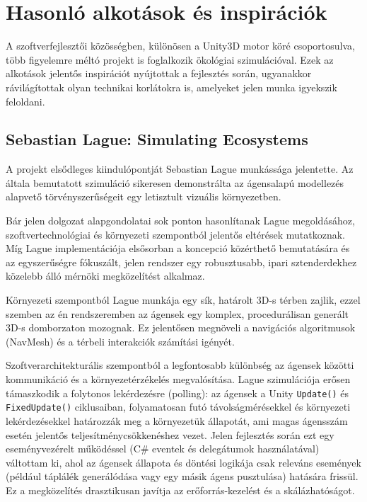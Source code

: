 \normalsize

\section{Hasonló alkotások és inspirációk}

A szoftverfejlesztői közösségben, különösen a Unity3D motor köré csoportosulva, több figyelemre méltó projekt is foglalkozik ökológiai szimulációval. Ezek az alkotások jelentős inspirációt nyújtottak a fejlesztés során, ugyanakkor rávilágítottak olyan technikai korlátokra is, amelyeket jelen munka igyekszik feloldani.

\subsection{Sebastian Lague: Simulating Ecosystems}

A projekt elsődleges kiindulópontját Sebastian Lague munkássága \cite{Sebastian19} jelentette. Az általa bemutatott szimuláció sikeresen demonstrálta az ágensalapú modellezés alapvető törvényszerűségeit egy letisztult vizuális környezetben. 

Bár jelen dolgozat alapgondolatai sok ponton hasonlítanak Lague megoldásához, szoftvertechnológiai és környezeti szempontból jelentős eltérések mutatkoznak. Míg Lague implementációja elsősorban a koncepció közérthető bemutatására és az egyszerűségre fókuszált, jelen rendszer egy robusztusabb, ipari sztenderdekhez közelebb álló mérnöki megközelítést alkalmaz. 

Környezeti szempontból Lague munkája egy sík, határolt 3D-s térben zajlik, ezzel szemben az én rendszeremben az ágensek egy komplex, procedurálisan generált 3D-s domborzaton mozognak. Ez jelentősen megnöveli a navigációs algoritmusok (NavMesh) és a térbeli interakciók számítási igényét.

Szoftverarchitekturális szempontból a legfontosabb különbség az ágensek közötti kommunikáció és a környezetérzékelés megvalósítása. Lague szimulációja erősen támaszkodik a folytonos lekérdezésre (polling): az ágensek a Unity \texttt{Update()} és \texttt{FixedUpdate()} ciklusaiban, folyamatosan futó távolságmérésekkel és környezeti lekérdezésekkel határozzák meg a környezetük állapotát, ami magas ágensszám esetén jelentős teljesítménycsökkenéshez vezet. Jelen fejlesztés során ezt egy eseményvezérelt működéssel (C\# eventek és delegátumok használatával) váltottam ki, ahol az ágensek állapota és döntési logikája csak releváns események (például táplálék generálódása vagy egy másik ágens pusztulása) hatására frissül. Ez a megközelítés drasztikusan javítja az erőforrás-kezelést és a skálázhatóságot.

